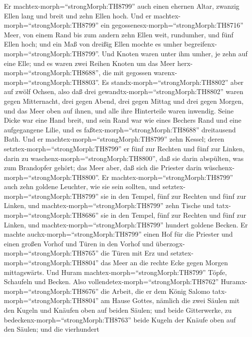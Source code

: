  Er machtex-morph=``strongMorph:TH8799'' auch einen ehernen
Altar, zwanzig Ellen lang und breit und zehn Ellen hoch. 
Und er machtex-morph=``strongMorph:TH8799'' ein
gegossenesx-morph=``strongMorph:TH8716'' Meer, von einem Rand bis zum
andern zehn Ellen weit, rundumher, und fünf Ellen hoch; und ein Maß von
dreißig Ellen mochte es umher begreifenx-morph=``strongMorph:TH8799''.
 Und Knoten waren unter ihm umher, je zehn auf eine Elle;
und es waren zwei Reihen Knoten um das Meer
herx-morph=``strongMorph:TH8688'', die mit gegossen
warenx-morph=``strongMorph:TH8803''.  Es
standx-morph=``strongMorph:TH8802'' aber auf zwölf Ochsen, also daß drei
gewandtx-morph=``strongMorph:TH8802'' waren gegen Mitternacht, drei
gegen Abend, drei gegen Mittag und drei gegen Morgen, und das Meer oben
auf ihnen, und alle ihre Hinterteile waren inwendig.  Seine
Dicke war eine Hand breit, und sein Rand war wie eines Bechers Rand und
eine aufgegangene Lilie, und es faßtex-morph=``strongMorph:TH8688''
dreitausend Bath.  Und er
machtex-morph=``strongMorph:TH8799'' zehn Kessel; deren
setztex-morph=``strongMorph:TH8799'' er fünf zur Rechten und fünf zur
Linken, darin zu waschenx-morph=``strongMorph:TH8800'', daß sie darin
abspülten, was zum Brandopfer gehört; das Meer aber, daß sich die
Priester darin wüschenx-morph=``strongMorph:TH8800''.  Er
machtex-morph=``strongMorph:TH8799'' auch zehn goldene Leuchter, wie sie
sein sollten, und setztex-morph=``strongMorph:TH8799'' sie in den
Tempel, fünf zur Rechten und fünf zur Linken,  und
machtex-morph=``strongMorph:TH8799'' zehn Tische und
tatx-morph=``strongMorph:TH8686'' sie in den Tempel, fünf zur Rechten
und fünf zur Linken, und machtex-morph=``strongMorph:TH8799'' hundert
goldene Becken.  Er machte
auchx-morph=``strongMorph:TH8799'' einen Hof für die Priester und einen
großen Vorhof und Türen in den Vorhof und
überzogx-morph=``strongMorph:TH8765'' die Türen mit Erz 
und setztex-morph=``strongMorph:TH8804'' das Meer an die rechte Ecke
gegen Morgen mittagswärts.  Und Huram
machtex-morph=``strongMorph:TH8799'' Töpfe, Schaufeln und Becken. Also
vollendetex-morph=``strongMorph:TH8762''
Huramx-morph=``strongMorph:TH8676'' die Arbeit, die er dem König Salomo
tatx-morph=``strongMorph:TH8804'' am Hause Gottes,  nämlich
die zwei Säulen mit den Kugeln und Knäufen oben auf beiden Säulen; und
beide Gitterwerke, zu bedeckenx-morph=``strongMorph:TH8763'' beide
Kugeln der Knäufe oben auf den Säulen;  und die vierhundert
